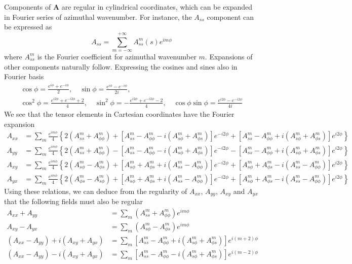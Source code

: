 Components of $\mathbf{A}$ are regular in cylindrical coordinates, which can be expanded in Fourier series of azimuthal wavenumber. For instance, the $A_{ss}$ component can be expressed as
\[
    A_{ss} = \sum_{m=-\infty}^{+\infty} A_{ss}^m(s) e^{im\phi}
\]
where $A_{ss}^m$ is the Fourier coefficient for azimuthal wavenumber $m$. Expansions of other components naturally follow. Expressing the cosines and sines also in Fourier basis
\[
\begin{gathered}
    \cos\phi = \frac{e^{i\phi} + e^{-i\phi}}{2},\quad \sin\phi = \frac{e^{i\phi} - e^{-i\phi}}{2i},\\
    \cos^2\phi = \frac{e^{i2\phi} + e^{-i2\phi} + 2}{4},\quad \sin^2\phi = -\frac{e^{i2\phi} + e^{-i2\phi} - 2}{4},\quad \cos\phi \sin\phi = \frac{e^{i2\phi} - e^{-i2\phi}}{4i}
\end{gathered}
\]
We see that the tensor elements in Cartesian coordinates have the Fourier expansion
\[\begin{aligned}
    A_{xx} &= \sum_m \frac{e^{im\phi}}{4} \left\{2\left(A_{ss}^m + A_{\phi\phi}^m\right) + \left[A_{ss}^m - A_{\phi\phi}^m - i \left(A_{s\phi}^m + A_{\phi s}^m\right)\right] e^{-i2\phi} + \left[A_{ss}^m - A_{\phi\phi}^m + i \left(A_{s\phi}^m + A_{\phi s}^m\right)\right] e^{i2\phi} \right\} \\ 
    A_{yy} &= \sum_m \frac{e^{im\phi}}{4} \left\{2\left(A_{ss}^m + A_{\phi\phi}^m\right) - \left[A_{ss}^m - A_{\phi\phi}^m - i \left(A_{s\phi}^m + A_{\phi s}^m\right)\right] e^{-i2\phi} - \left[A_{ss}^m - A_{\phi\phi}^m + i \left(A_{s\phi}^m + A_{\phi s}^m\right)\right] e^{i2\phi} \right\} \\ 
    A_{xy} &= \sum_m \frac{e^{im\phi}}{4} \left\{2 \left(A_{s\phi}^m - A_{\phi s}^m\right) + \left[A_{s\phi}^m + A_{\phi s}^m + i \left(A_{ss}^m - A_{\phi\phi}^m\right)\right]e^{-i2\phi} + \left[A_{s\phi}^m + A_{\phi s}^m - i \left(A_{ss}^m - A_{\phi\phi}^m\right)\right]e^{i2\phi}\right\} \\
    A_{yx} &= \sum_m \frac{e^{im\phi}}{4} \left\{2 \left(A_{\phi s}^m - A_{s\phi}^m\right) + \left[A_{s\phi}^m + A_{\phi s}^m + i \left(A_{ss}^m - A_{\phi\phi}^m\right)\right]e^{-i2\phi} + \left[A_{s\phi}^m + A_{\phi s}^m - i \left(A_{ss}^m - A_{\phi\phi}^m\right)\right]e^{i2\phi}\right\}
\end{aligned}\]
Using these relations, we can deduce from the regularity of $A_{xx}$, $A_{yy}$, $A_{xy}$ and $A_{yx}$ that the following fields must also be regular
\[
\begin{aligned}
    A_{xx} + A_{yy} &= \sum_m \left(A_{ss}^m + A_{\phi\phi}^m\right) e^{im\phi} \\ 
    A_{xy} - A_{yx} &= \sum_m \left(A_{s\phi}^m - A_{\phi s}^m\right) e^{im\phi} \\ 
    \left(A_{xx} - A_{yy}\right) + i \left(A_{xy} + A_{yx}\right) &= \sum_m \left[A_{ss}^m - A_{\phi\phi}^m + i \left(A_{s\phi}^m + A_{\phi s}^m\right)\right] e^{i(m+2)\phi} \\
    \left(A_{xx} - A_{yy}\right) - i \left(A_{xy} + A_{yx}\right) &= \sum_m \left[A_{ss}^m - A_{\phi\phi}^m - i \left(A_{s\phi}^m + A_{\phi s}^m\right)\right] e^{i(m-2)\phi}
\end{aligned}
\]

